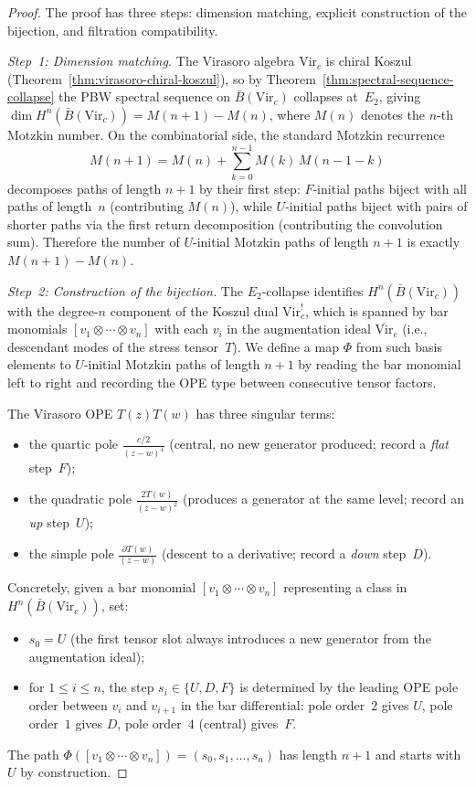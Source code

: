 \begin{proof}
The proof has three steps: dimension matching,
explicit construction of the bijection, and filtration compatibility.

\medskip
\noindent\emph{Step~1: Dimension matching.}
The Virasoro algebra $\mathrm{Vir}_c$ is chiral Koszul
(Theorem~\ref{thm:virasoro-chiral-koszul}), so
by Theorem~\ref{thm:spectral-sequence-collapse} the
PBW spectral sequence on $\bar{B}(\mathrm{Vir}_c)$
collapses at~$E_2$, giving
$\dim H^n(\bar{B}(\mathrm{Vir}_c)) = M(n{+}1) - M(n)$,
where $M(n)$ denotes the $n$-th Motzkin number.
On the combinatorial side, the standard Motzkin recurrence
\[
M(n{+}1) = M(n) + \sum_{k=0}^{n-1} M(k)\,M(n{-}1{-}k)
\]
decomposes paths of length $n{+}1$ by their first step:
$F$-initial paths biject with all paths of length~$n$
(contributing $M(n)$), while $U$-initial paths biject with
pairs of shorter paths via the first return decomposition
(contributing the convolution sum). Therefore the number
of $U$-initial Motzkin paths of length $n{+}1$ is exactly
$M(n{+}1) - M(n)$.

\medskip
\noindent\emph{Step~2: Construction of the bijection.}
The $E_2$-collapse identifies $H^n(\bar{B}(\mathrm{Vir}_c))$
with the degree-$n$ component of the Koszul dual
$\mathrm{Vir}_c^!$, which is spanned by bar monomials
$[v_1 \otimes \cdots \otimes v_n]$ with each $v_i$ in
the augmentation ideal $\overline{\mathrm{Vir}}_c$
(i.e., descendant modes of the stress tensor~$T$).
We define a map $\Phi$ from such basis elements to
$U$-initial Motzkin paths of length $n{+}1$ by reading
the bar monomial left to right and recording the OPE
type between consecutive tensor factors.

The Virasoro OPE $T(z)T(w)$ has three singular terms:
\begin{itemize}
\item the quartic pole $\frac{c/2}{(z-w)^4}$ (central,
 no new generator produced; record a \emph{flat} step~$F$);
\item the quadratic pole $\frac{2T(w)}{(z-w)^2}$ (produces
 a generator at the same level; record an \emph{up} step~$U$);
\item the simple pole $\frac{\partial T(w)}{(z-w)}$
 (descent to a derivative; record a \emph{down} step~$D$).
\end{itemize}
Concretely, given a bar monomial
$[v_1 \otimes \cdots \otimes v_n]$ representing a class
in $H^n(\bar{B}(\mathrm{Vir}_c))$, set:
\begin{itemize}
\item $s_0 = U$ (the first tensor slot always introduces
 a new generator from the augmentation ideal);
\item for $1 \leq i \leq n$, the step $s_i \in \{U,D,F\}$
 is determined by the leading OPE pole order
 between $v_i$ and $v_{i+1}$ in the bar differential:
 pole order~$2$ gives $U$, pole order~$1$ gives $D$,
 pole order~$4$ (central) gives~$F$.
\end{itemize}
The path $\Phi([v_1 \otimes \cdots \otimes v_n])
= (s_0, s_1, \ldots, s_n)$ has length $n{+}1$ and
starts with~$U$ by construction.


\end{proof}
